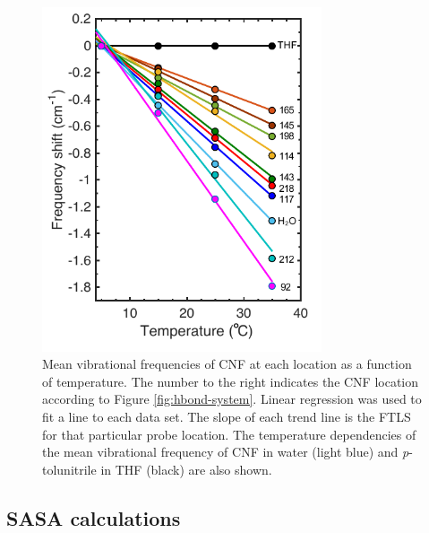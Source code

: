 \begin{figure}
    \center
    \includegraphics[width=3.25in]{figures-gfp-hbond/FTLS.pdf}
    \caption{Mean vibrational frequencies of CNF at each location as a function of temperature. The number to the right indicates the CNF location according to Figure \ref{fig:hbond-system}. Linear regression was used to fit a line to each data set. The slope of each trend line is the FTLS for that particular probe location. The temperature dependencies of the mean vibrational frequency of CNF in water (light blue) and \emph{p}-tolunitrile in THF (black) are also shown.}
    \label{fig:hbond-ftls}
\end{figure}

\subsection{SASA calculations}

